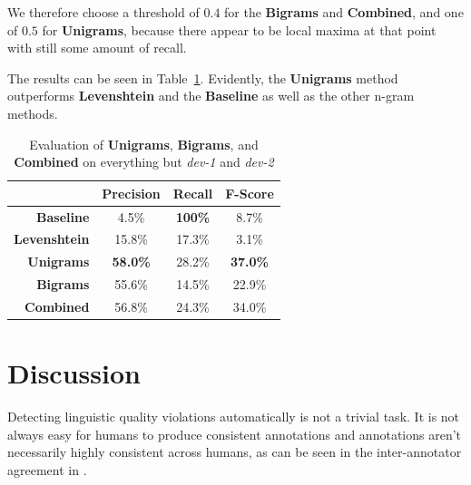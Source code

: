 \documentclass[a4paper,10pt]{scrartcl}
\theoremstyle{style}
\begin{document}
We therefore choose a threshold of $0.4$ for the \textbf{Bigrams} and \textbf{Combined}, and one of $0.5$ for \textbf{Unigrams}, because there appear to be local maxima at that point with still some amount of recall.

The results can be seen in Table~\ref{eval_redundancy}. Evidently, the \textbf{Unigrams} method outperforms \textbf{Levenshtein} and the \textbf{Baseline} as well as the other n-gram methods.

\begin{table}
\begin{center}
\begin{tabular}{r|c|c|c|}
& Precision & Recall & F-Score \\
\hline
\textbf{Baseline} & 4.5\% & \textbf{100\%} & 8.7\% \\
\hline
\textbf{Levenshtein} & 15.8\% & 17.3\% & 3.1\% \\
\hline
\textbf{Unigrams} & \textbf{58.0\%} & 28.2\% & \textbf{37.0\%} \\
\hline
\textbf{Bigrams} & 55.6\% & 14.5\% & 22.9\% \\
\hline
\textbf{Combined} & 56.8\% & 24.3\% & 34.0\% \\
\hline
\end{tabular}
\end{center}
\caption{Evaluation of \textbf{Unigrams}, \textbf{Bigrams}, and \textbf{Combined} on everything but \textit{dev-1} and \textit{dev-2}}
\label{eval_redundancy}
\end{table}





\section{Discussion}
\label{discussion}
Detecting linguistic quality violations automatically is not a trivial task. It is not always easy for humans to produce consistent annotations and annotations aren't necessarily highly consistent across humans, as can be seen in the inter-annotator agreement in \cite{friedrichlqvsumm}.
\end{document}
